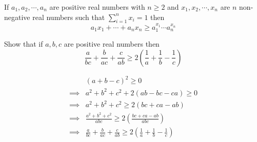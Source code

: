 \begin{theorem}
    If $a_{1}, a_{2}, \cdots, a_{n}$ are positive real numbers with $n\geq 2$ and 
    $x_{1}, x_{2}, \cdots, x_{n}$ are $n$ non-negative real numbers such that 
    $\sum_{i=1}^{n} x_{i}=1$ then 
    \[
        a_{1}x_{1} + \cdots + a_{n}x_{n} \geq a_{1}^{x_{1}} \cdots a_{n}^{x_{n}}
    \]
\end{theorem}

\begin{problem}[BDMO 2019]
    Show that if $a,b,c$ are positive real numbers then
    \[
        \frac{a}{bc} + \frac{b}{ac} + \frac{c}{ab} \geq 2\left(\frac{1}{a} + \frac{1}{b} - \frac{1}{c}\right)
    \]
\end{problem}
\begin{sol}
    \begin{align*}
                 & (a+b-c)^{2} \geq 0 \\
        \implies & a^{2} + b^{2} + c^{2} + 2(ab - bc - ca) \geq 0 \\
        \implies & a^{2} + b^{2} + c^{2} \geq 2(bc + ca - ab) \\
        \implies & \frac{a^{2} + b^{2} + c^{2}}{abc} \geq 2\left(\frac{bc+ ca - ab}{abc}\right) \\
        \implies & \frac{a}{bc} + \frac{b}{ac} + \frac{c}{ab} \geq 2\left(\frac{1}{a} + \frac{1}{b} - \frac{1}{c}\right)
    \end{align*}
\end{sol}
